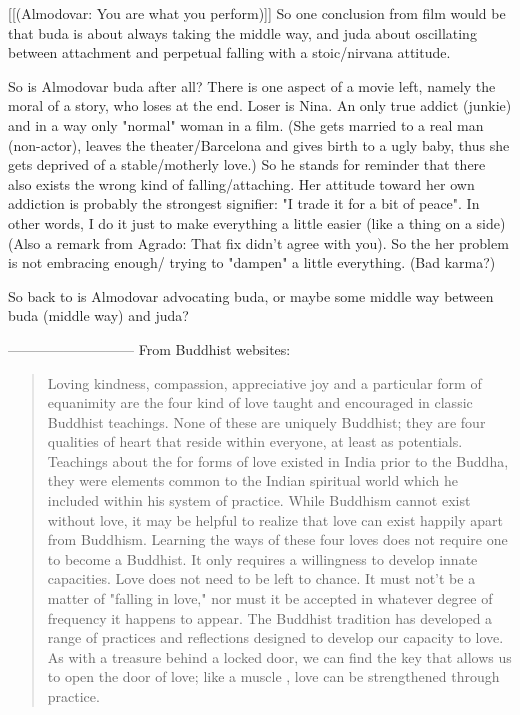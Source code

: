\documentclass[10pt]{book}
\begin{document}
[[(Almodovar: You are what you perform)]]
So one conclusion from film would be that buda is about always taking the middle way, and juda about oscillating between attachment and perpetual falling with a stoic/nirvana attitude.

So is Almodovar buda after all? There is one aspect of a movie left, namely the moral of a story, who loses at the end. Loser is Nina. An only true addict (junkie) and in a way only "normal" woman in a film. (She gets married to a real man (non-actor), leaves the theater/Barcelona and gives birth to a ugly baby, thus she gets deprived of a stable/motherly love.) So he stands for reminder that there also exists the wrong kind of falling/attaching. Her attitude toward her own addiction is probably the strongest signifier: "I trade it for a bit of peace". In other words, I do it just to make everything a little easier (like a thing on a side) (Also a remark from Agrado: That fix didn't agree with you). So the her problem is not embracing enough/ trying to "dampen" a little everything. (Bad karma?)

So back to is Almodovar advocating buda, or maybe some middle way between buda (middle way) and juda?  

---------------------------
From Buddhist websites:
\begin{quotation}
Loving kindness, compassion, appreciative joy and a particular form of equanimity are the four kind of love taught and encouraged in classic Buddhist teachings. None of these are uniquely Buddhist; they are four qualities of heart that reside within everyone, at least as potentials. Teachings about the for forms of love existed in India prior to the Buddha, they were elements common to the Indian spiritual world which he included within his system of practice. While Buddhism cannot exist without love, it may be helpful to realize that love can exist happily apart from Buddhism. Learning the ways of these four loves does not require one to become a Buddhist. It only requires a willingness to develop innate capacities.
Love does not need to be left to chance. It must not't be a matter of "falling in love," nor must it be accepted in whatever degree of frequency it happens to appear. The Buddhist tradition has developed a range of practices and reflections designed to develop our capacity to love. As with a treasure behind a locked door, we can find the key that allows us to open the door of love; like a muscle , love can be strengthened through practice.
\end{quotation}
\end{document}
